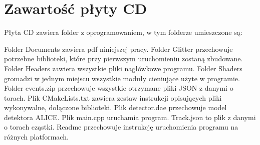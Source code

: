 \begin{appendices}
\begin{figure}[H]
    \label{rys31}
\end{figure}

\newpage
\section{Zawartość płyty CD}
Płyta CD zawiera folder z oprogramowaniem, w tym folderze umieszczone są: 
\begin{itemize}
\itemi Folder Documents zawiera pdf niniejszej pracy.
\itemi Folder Glitter przechowuje potrzebne biblioteki, które przy pierwszym uruchomieniu zostaną zbudowane.
\itemi Folder Headers zawiera wszystkie pliki nagłówkowe programu.
\itemi Folder Shaders gromadzi w jednym miejscu wszystkie moduły cieniujące użyte w programie.
\itemi Folder events.zip przechowuje wszystkie otrzymane pliki JSON z danymi o torach.
\itemi Plik CMakeLists.txt zawiera zestaw instrukcji opisujących pliki wykonywalne, dołączone biblioteki. 
\itemi Plik detector.dae przechowuje model detektora ALICE.
\itemi Plik main.cpp uruchamia program.
\itemi Track.json to plik z danymi o torach cząstki.
\itemi Readme przechowuje instrukcję uruchomienia programu na różnych platformach.
\end{itemize}
\end{appendices}



